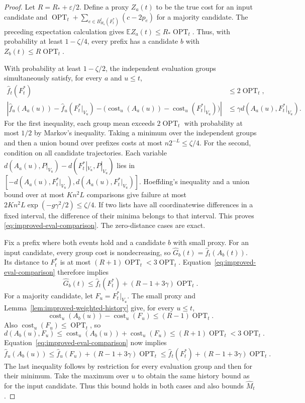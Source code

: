 \documentclass[11pt]{article}
\begin{document}
\begin{proof}
Let $R=R_*+\varepsilon/2$. Define a proxy $Z_a(t)$ to be the true
cost for an input candidate and
$\operatorname{OPT}_t+\sum_{e\in B_{H_a}^t(F_t^*)}(c-2p_e)$ for a majority candidate.
The preceding expectation calculation gives
$\mathbb E Z_a(t)\le R_*\operatorname{OPT}_t$.
Thus, with probability at least $1-\zeta/4$, every prefix has a candidate
$b$ with $Z_b(t)\le R\operatorname{OPT}_t$.

With probability at least $1-\zeta/2$, the independent evaluation groups
simultaneously satisfy, for every $a$ and $u\le t$,
\begin{align}
 \widehat f_t(F_t^*)&\le2\operatorname{OPT}_t,
 \label{eq:improved-eval-ceiling}\\
 \left|\widehat f_u(A_a(u))-\widehat f_u(F_t^*|_{V_u})
       -\bigl(\operatorname{cost}_u(A_a(u))
              -\operatorname{cost}_u(F_t^*|_{V_u})\bigr)\right|
 &\le\gamma d(A_a(u),F_t^*|_{V_u}).
 \label{eq:improved-eval-comparison}
\end{align}
For the first inequality, each group mean exceeds
$2\operatorname{OPT}_t$ with probability at most $1/2$ by Markov's
inequality. Taking a minimum over the independent groups and then a union
bound over prefixes costs at most $n2^{-L}\le\zeta/4$.
For the second, condition on all candidate trajectories. Each variable
$d(A_a(u),P|_{V_u})-d(F_t^*|_{V_u},P|_{V_u})$ lies in
$[-d(A_a(u),F_t^*|_{V_u}),d(A_a(u),F_t^*|_{V_u})]$.
Hoeffding's inequality and a union bound over at most $Kn^2L$ comparisons
give failure at most
$2Kn^2L\exp(-g\gamma^2/2)\le\zeta/4$.
If two lists have all coordinatewise differences in a fixed interval,
the difference of their minima belongs to that interval. This proves
\eqref{eq:improved-eval-comparison}. The zero-distance cases are exact.

Fix a prefix where both events hold and a candidate $b$ with small proxy.
For an input candidate, every group cost is nondecreasing, so
$\widehat G_b(t)=\widehat f_t(A_b(t))$.
Its distance to $F_t^*$ is at most
$(R+1)\operatorname{OPT}_t<3\operatorname{OPT}_t$.
Equation~\eqref{eq:improved-eval-comparison} therefore implies
\[
 \widehat G_b(t)
 \le\widehat f_t(F_t^*)+(R-1+3\gamma)\operatorname{OPT}_t.
\]
For a majority candidate, let $F_u=F_t^*|_{V_u}$. The small proxy and
Lemma~\ref{lem:improved-weighted-history} give, for every $u\le t$,
\[
 \operatorname{cost}_u(A_b(u))-\operatorname{cost}_u(F_u)
 \le (R-1)\operatorname{OPT}_t.
\]
Also $\operatorname{cost}_u(F_u)\le\operatorname{OPT}_t$, so
\[
 d(A_b(u),F_u)
 \le\operatorname{cost}_u(A_b(u))+\operatorname{cost}_u(F_u)
 \le(R+1)\operatorname{OPT}_t<3\operatorname{OPT}_t.
\]
Equation~\eqref{eq:improved-eval-comparison} now implies
\[
 \widehat f_u(A_b(u))
 \le\widehat f_u(F_u)+(R-1+3\gamma)\operatorname{OPT}_t
 \le\widehat f_t(F_t^*)+(R-1+3\gamma)\operatorname{OPT}_t.
\]
The last inequality follows by restriction for every evaluation group
and then for their minimum. Take the maximum over $u$ to obtain the
same history bound as for the input candidate.
Thus this bound holds in both cases and also bounds
$\widehat M_t$.


\end{proof}
\end{document}
